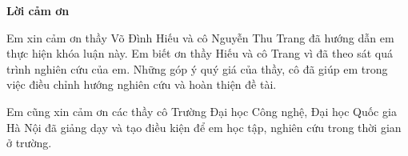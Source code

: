 \begin{center}
\textbf{\large Lời cảm ơn}
\end{center}

Em xin cảm ơn thầy Võ Đình Hiếu và cô Nguyễn Thu Trang đã hướng dẫn em thực hiện khóa luận này. Em biết ơn thầy Hiếu và cô Trang vì đã theo sát quá trình nghiên cứu của em. Những góp ý quý giá của thầy, cô đã giúp em trong việc điều chỉnh hướng nghiên cứu và hoàn thiện đề tài.

Em cũng xin cảm ơn các thầy cô Trường Đại học Công nghệ, Đại học Quốc gia Hà Nội đã giảng dạy và tạo điều kiện để em học tập, nghiên cứu trong thời gian ở trường.
